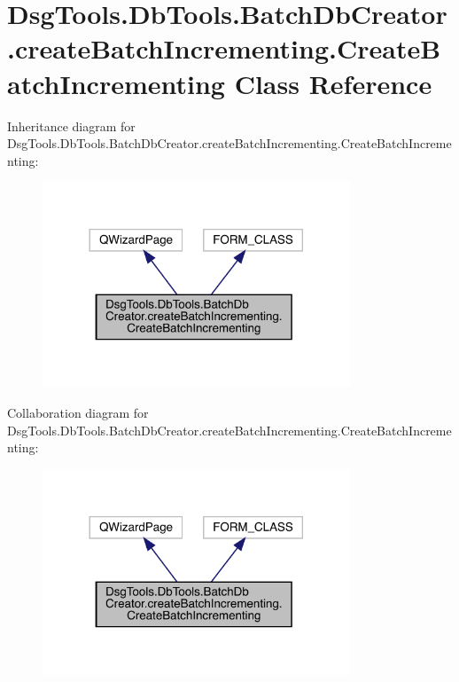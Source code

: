 \hypertarget{class_dsg_tools_1_1_db_tools_1_1_batch_db_creator_1_1create_batch_incrementing_1_1_create_batch_incrementing}{}\section{Dsg\+Tools.\+Db\+Tools.\+Batch\+Db\+Creator.\+create\+Batch\+Incrementing.\+Create\+Batch\+Incrementing Class Reference}
\label{class_dsg_tools_1_1_db_tools_1_1_batch_db_creator_1_1create_batch_incrementing_1_1_create_batch_incrementing}


Inheritance diagram for Dsg\+Tools.\+Db\+Tools.\+Batch\+Db\+Creator.\+create\+Batch\+Incrementing.\+Create\+Batch\+Incrementing\+:
\nopagebreak
\begin{figure}[H]
\begin{center}
\leavevmode
\includegraphics[width=260pt]{class_dsg_tools_1_1_db_tools_1_1_batch_db_creator_1_1create_batch_incrementing_1_1_create_batch_incrementing__inherit__graph}
\end{center}
\end{figure}


Collaboration diagram for Dsg\+Tools.\+Db\+Tools.\+Batch\+Db\+Creator.\+create\+Batch\+Incrementing.\+Create\+Batch\+Incrementing\+:
\nopagebreak
\begin{figure}[H]
\begin{center}
\leavevmode
\includegraphics[width=260pt]{class_dsg_tools_1_1_db_tools_1_1_batch_db_creator_1_1create_batch_incrementing_1_1_create_batch_incrementing__coll__graph}
\end{center}
\end{figure}
